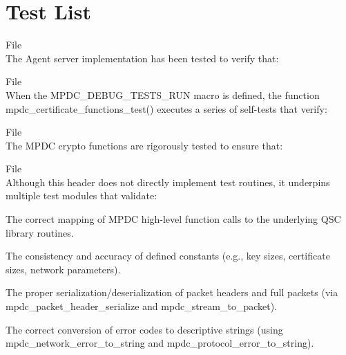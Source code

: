 \chapter{Test List}
\hypertarget{test}{}\label{test}

\begin{DoxyRefList}
\item[File \doxylink{agent_8h}{agent.h} ]\hfill \\
\label{test__test000001}%
%
 The Agent server implementation has been tested to verify that\+: 
\item[File \doxylink{certificate_8h}{certificate.h} ]\hfill \\
\label{test__test000002}%
%
 When the MPDC\+\_\+\+DEBUG\+\_\+\+TESTS\+\_\+\+RUN macro is defined, the function mpdc\+\_\+certificate\+\_\+functions\+\_\+test() executes a series of self-\/tests that verify\+: 
\item[File \doxylink{crypto_8h}{crypto.h} ]\hfill \\
\label{test__test000003}%
%
 The MPDC crypto functions are rigorously tested to ensure that\+: 
\item[File \doxylink{mpdc_8h}{mpdc.h} ]\hfill \\
\label{test__test000004}%
%
 Although this header does not directly implement test routines, it underpins multiple test modules that validate\+:
\begin{DoxyItemize}
\item The correct mapping of MPDC high-\/level function calls to the underlying QSC library routines.
\item The consistency and accuracy of defined constants (e.\+g., key sizes, certificate sizes, network parameters).
\item The proper serialization/deserialization of packet headers and full packets (via mpdc\+\_\+packet\+\_\+header\+\_\+serialize and mpdc\+\_\+stream\+\_\+to\+\_\+packet).
\item The correct conversion of error codes to descriptive strings (using mpdc\+\_\+network\+\_\+error\+\_\+to\+\_\+string and mpdc\+\_\+protocol\+\_\+error\+\_\+to\+\_\+string).
\end{DoxyItemize}
\end{DoxyRefList}